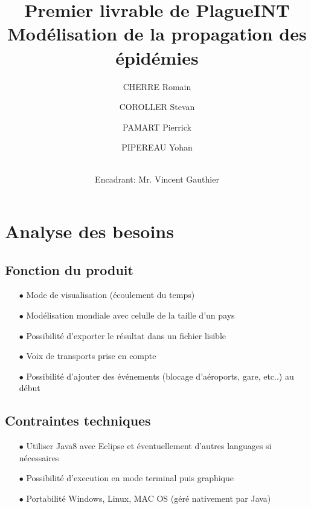 \documentclass[12pt,a4paper]{report}
\title{ \Huge \textbf{Premier livrable de PlagueINT} \\ \large Modélisation de la propagation des épidémies}
\author{
CHERRE Romain
\and COROLLER Stevan 
\and PAMART Pierrick
\and PIPEREAU Yohan
\and \\
Encadrant: Mr. Vincent Gauthier }
\begin{document}
\maketitle

\tableofcontents

\newpage

\section*{Analyse des besoins}

\subsection*{Fonction du produit}
\begin{flushleft}
  \begin{itemize}
	\item[$\bullet$] Mode de visualisation (écoulement du temps) 
	\item[$\bullet$] Modélisation mondiale avec celulle de la taille d'un pays
	\item[$\bullet$] Possibilité d'exporter le résultat dans un fichier lisible 
	\item[$\bullet$] Voix de transports prise en compte 
	\item[$\bullet$] Possibilité d'ajouter des événements (blocage d'aéroports, gare, etc..) au début
  \end{itemize}
\end{flushleft}

\subsection*{Contraintes techniques}
\begin{flushleft}
  \begin{itemize}
	\item[$\bullet$] Utiliser Java8 avec Eclipse et éventuellement d'autres languages si nécessaires 
	\item[$\bullet$] Possibilité d'execution en mode terminal puis graphique
	\item[$\bullet$] Portabilité Windows, Linux, MAC OS (géré nativement par Java)
    \end{itemize}
\end{flushleft}
\end{document}
